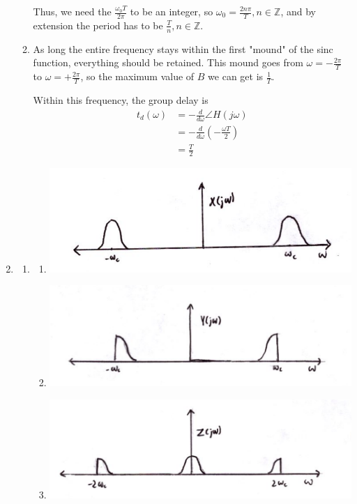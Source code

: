 \documentclass[12pt]{article}
\begin{document}
\begin{enumerate}
\begin{enumerate}
                        Thus, we need the $\frac{\omega_0 T}{2\pi}$ to be an integer,
                        so $\omega_0=\frac{2n\pi}{T}, n \in \mathbb{Z}$, and by extension
                        the period has to be $\boxed{\frac{T}{n}, n \in \mathbb{Z}}$.
                  \item As long the entire frequency stays within the first "mound"
                        of the sinc function, everything should be retained.
                        This mound goes from $\omega=-\frac{2\pi}{T}$ to $\omega=+\frac{2\pi}{T}$,
                        so the maximum value of $B$ we can get is $\boxed{\frac{1}{T}}$.

                        Within this frequency, the group delay is
                        \begin{align*}
                              t_d(\omega)
                               & = -\frac{d}{d\omega} \angle H(j\omega)                \\
                               & = -\frac{d}{d\omega} \left(-\frac{\omega T}{2}\right) \\
                               & = \boxed{\frac{T}{2}}
                        \end{align*}
            \end{enumerate}
      \item \begin{enumerate}
                  \item \begin{enumerate}
                              \item \includegraphics[width=12cm]{img/hw6/x}
                              \item \includegraphics[width=12cm]{img/hw6/y}
                              \item \includegraphics[width=12cm]{img/hw6/z}
                        \end{enumerate}


\end{enumerate}
\end{enumerate}
\end{document}
